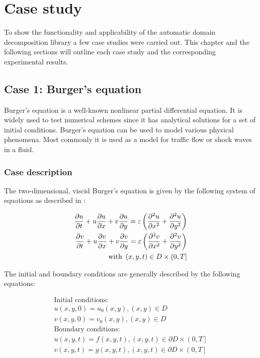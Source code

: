 \section{Case study}

To show the functionality and applicability of the automatic domain decomposition library a few case studies were carried out.
This chapter and the following sections will outline each case study and the corresponding experimental results.

\subsection{Case 1: Burger's equation}
Burger's equation is a well-known nonlinear partial differential equation.
It is widely used to test numerical schemes since it has analytical solutions for a set of initial conditions.
Burger's equation can be used to model various physical phenomena.
Most commonly it is used as a model for traffic flow or shock waves in a fluid.

\subsubsection{Case description}

The two-dimensional, viscid Burger's equation is given by the following system of equations as described in \citet{zhao2011new}:

\begin{equation}
\begin{split}
\frac{\partial u}{\partial t} + u \frac{\partial u}{\partial x} + v \frac{\partial u}{\partial y} = \varepsilon \left( \frac{\partial ^2 u}{\partial x^2} + \frac{\partial ^2 u}{\partial y^2} \right) \\
\frac{\partial v}{\partial t} + u \frac{\partial v}{\partial x} + v \frac{\partial v}{\partial y} = \varepsilon \left( \frac{\partial ^2 v}{\partial x^2} + \frac{\partial ^2 v}{\partial y^2} \right) \\
\text{with } \left(x, y, t\right) \in D \times \left(0,T\right]
\end{split}
\end{equation}

The initial and boundary conditions are generally described by the following equations:

\begin{equation}
\begin{split}
\text{Initial conditions: } \\
u\left(x, y, 0\right) = u_0\left(x, y\right), \left(x, y\right) \in D \\
v\left(x, y, 0\right) = v_0\left(x, y\right), \left(x, y\right) \in D \\
\text{Boundary conditions: } \\
u\left(x, y, t\right) = f\left(x, y, t\right), \left(x, y, t\right) \in \partial D \times \left(0, T\right] \\
v\left(x, y, t\right) = g\left(x, y, t\right), \left(x, y, t\right) \in \partial D \times \left(0, T\right]
\end{split}
\end{equation}

